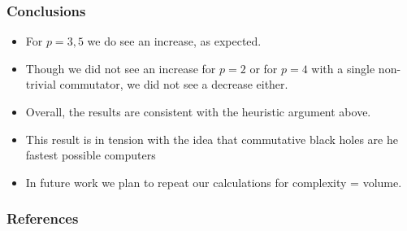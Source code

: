\documentclass[10pt]{beamer}
\begin{document}
\begin{frame}
\frametitle{Conclusions}

\begin{itemize}

\item For $p=3,5$ we do see an increase, as expected.

\item Though we did not see an increase for $p=2$ or for $p=4$ with a single non-trivial commutator, we did not see a decrease either.

\item Overall, the results are consistent with the heuristic argument above.

\item This result is in tension with the idea that commutative black holes are he fastest possible computers

\item In future work we plan to repeat our calculations for complexity = volume.

\end{itemize}

\end{frame}

\begin{frame}
\frametitle{References}

\footnotesize %

\end{frame}
\end{document}

